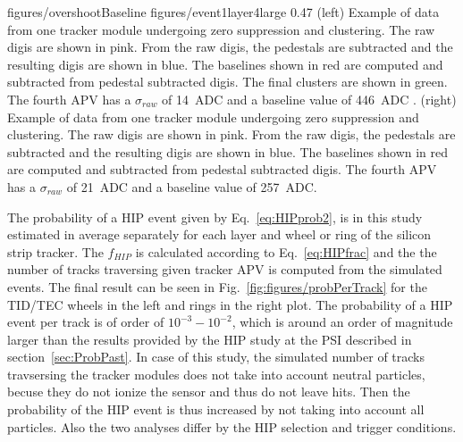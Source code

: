                  {figures/overshootBaseline} %
                 {figures/event1layer4large} %
                 {0.47}       %
                 {(left) Example of data from one tracker module undergoing zero suppression and clustering. The raw digis are shown in pink. From the raw digis, the pedestals are subtracted and the resulting digis are shown in blue. The baselines shown in red are computed and subtracted from pedestal subtracted digis. The final clusters are shown in green. The fourth APV has a $\sigma_{raw}$ of 14~ADC and a baseline value of 446~ADC . (right) Example of data from one tracker module undergoing zero suppression and clustering. The raw digis are shown in pink. From the raw digis, the pedestals are subtracted and the resulting digis are shown in blue. The baselines shown in red are computed and subtracted from pedestal subtracted digis. The fourth APV has a $\sigma_{raw}$ of 21~ADC and a baseline value of 257~ADC.} %


The probability of a HIP event given by Eq.~\ref{eq:HIPprob2}, is in this study estimated in average separately for each layer and wheel or ring of the silicon strip tracker.  The $f_{HIP}$ is calculated according to Eq.~\ref{eq:HIPfrac} and the the number of tracks traversing given tracker APV is computed from the simulated events. The final result can be seen in Fig.~\ref{fig:figures/probPerTrack} for the TID/TEC wheels in the left and rings in the right plot. The probability of a HIP event per track is of order of $10^{-3}-10^{-2}$, which is around an order of magnitude larger than the results provided by the HIP study at the PSI described in section~\ref{sec:ProbPast}. In case of this study, the simulated number of tracks travsersing the tracker modules does not take into account neutral particles, becuse they do not ionize the sensor and thus do not leave hits. Then the probability of the HIP event is thus increased by not taking into account all particles. Also the two analyses differ by the HIP selection and trigger conditions.

